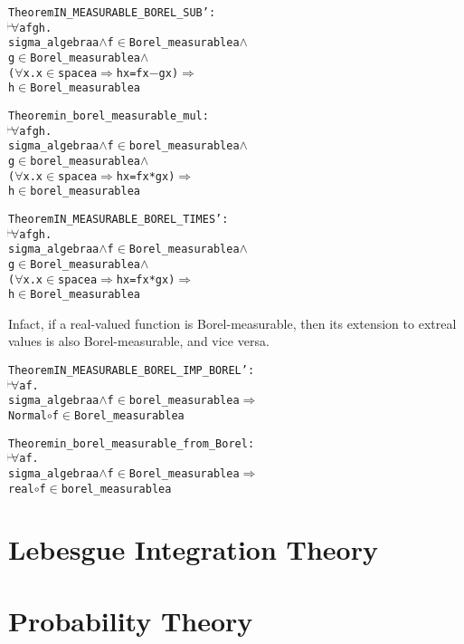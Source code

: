 \begin{hol}
\begin{alltt}
Theorem IN\_MEASURABLE\_BOREL\_SUB' :
\(\!\!\!{\turn}\!\!\!\!\) \(\forall\)a f g h.
sigma\_algebra a \(\land\) f \(\in\) Borel\_measurable a \(\land\)
g \(\in\) Borel\_measurable a \(\land\)
(\(\forall\)x. x \(\in\) space a \(\Rightarrow\) h x = f x \({-}\) g x) \(\Rightarrow\)
h \(\in\) Borel\_measurable a
\end{alltt}
\end{hol}

\begin{hol}
\begin{alltt}
Theorem in\_borel\_measurable\_mul :
\(\!\!\!{\turn}\!\!\!\!\) \(\forall\)a f g h.
sigma\_algebra a \(\land\) f \(\in\) borel\_measurable a \(\land\)
g \(\in\) borel\_measurable a \(\land\)
(\(\forall\)x. x \(\in\) space a \(\Rightarrow\) h x = f x * g x) \(\Rightarrow\)
h \(\in\) borel\_measurable a
\end{alltt}
\end{hol}

\begin{hol}
\begin{alltt}
Theorem IN\_MEASURABLE\_BOREL\_TIMES' :
\(\!\!\!{\turn}\!\!\!\!\) \(\forall\)a f g h.
sigma\_algebra a \(\land\) f \(\in\) Borel\_measurable a \(\land\)
g \(\in\) Borel\_measurable a \(\land\)
(\(\forall\)x. x \(\in\) space a \(\Rightarrow\) h x = f x * g x) \(\Rightarrow\)
h \(\in\) Borel\_measurable a
\end{alltt}
\end{hol}


Infact, if a real-valued function is Borel-measurable, then its extension to extreal values is also Borel-measurable, and vice versa.

\begin{hol}
\begin{alltt}
Theorem IN\_MEASURABLE\_BOREL\_IMP\_BOREL' :
\(\!\!\!{\turn}\!\!\!\!\) \(\forall\)a f.
sigma\_algebra a \(\land\) f \(\in\) borel\_measurable a \(\Rightarrow\)
Normal \(\circ\) f \(\in\) Borel\_measurable a
\end{alltt}
\end{hol}

\begin{hol}
\begin{alltt}
Theorem in\_borel\_measurable\_from\_Borel :
\(\!\!\!{\turn}\!\!\!\!\) \(\forall\)a f.
sigma\_algebra a \(\land\) f \(\in\) Borel\_measurable a \(\Rightarrow\)
real \(\circ\) f \(\in\) borel\_measurable a
\end{alltt}
\end{hol}

\section{Lebesgue Integration Theory}

\section{Probability Theory}
